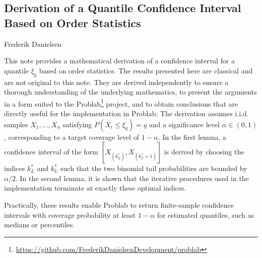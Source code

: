 \documentclass{article}
\begin{document}
\begin{center}
\section*{Derivation of a Quantile Confidence Interval Based on Order Statistics}
{\small Frederik Danielsen}
\end{center}

\vspace{1em}

\noindent This note provides a mathematical derivation of a confidence interval for a quantile $\xi_q$ based on order statistics. The results presented here are classical and are not original to this note. They are derived independently to ensure a thorough understanding of the underlying mathematics, to present the arguments in a form suited to the Problab\footnote{\url{https://github.com/FrederikDanielsenDevelopment/problab}} project, and to obtain conclusions that are directly useful for the implementation in Problab. The derivation assumes i.i.d. samples $X_1,\ldots,X_n$ satisfying $P(X_i\leq\xi_q)=q$ and a significance level $\alpha\in(0,1)$, corresponding to a target coverage level of $1-\alpha$. In the first lemma, a confidence interval of the form $[X_{(k_L^*)},X_{(k_U^*+1)}]$ is derived by choosing the indices $k_L^*$ and $k_U^*$ such that the two binomial tail probabilities are bounded by $\alpha/2$. In the second lemma, it is shown that the iterative procedures used in the implementation terminate at exactly these optimal indices.

Practically, these results enable Problab to return finite-sample confidence intervals with coverage probability at least $1-\alpha$ for estimated quantiles, such as medians or percentiles.

\vspace{2em}
\end{document}
